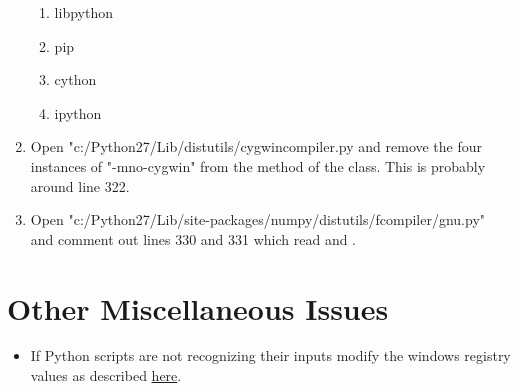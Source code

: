 \begin{enumerate}
\begin{enumerate}
	\item libpython
	\item pip
	\item cython
	\item ipython
\end{enumerate}
\item Open "c:/Python27/Lib/distutils/cygwincompiler.py and remove the four instances of "-mno-cygwin" from the  method of the  class.
This is probably around line 322.
\item Open "c:/Python27/Lib/site-packages/numpy/distutils/fcompiler/gnu.py" and comment out lines 330 and 331 which read  and .
\end{enumerate}

\begin{comment}

\section*{Installing MinGW64}
You may wish at some point to istall a 64 bit version of the MinGW compiler suite.
That can be done like this:
\begin{enumerate}
\item Install 7zip from \url{http://www.7-zip.org/}
\item Install MinGw64 by downloading a precompiled binary from \url{http://sourceforge.net/projects/mingw-w64/files/Toolchains%20targetting%20Win64/} 
\begin{enumerate}
	\item Unzip the package using 7-zip.
		We recommend a folder location like "c:/MinGW64"
	\item Add ";C:/MinGW64/bin;C:/MinGW64/include;C:/MinGW64/lib" to your user path.
		This is NOT your system path, it is your user path.
		They can both be edited in the same menu, but this will not work if it is in your system path.
\end{enumerate}
\end{enumerate}

\end{comment}

\section*{Other Miscellaneous Issues}
\begin{itemize}
\item If Python scripts are not recognizing their inputs modify the windows registry values as described \href{http://stackoverflow.com/questions/2640971/windows-is-not-passing-command-line-arguments-to-python-programs-executed-from-t}{here}.
\end{itemize}

